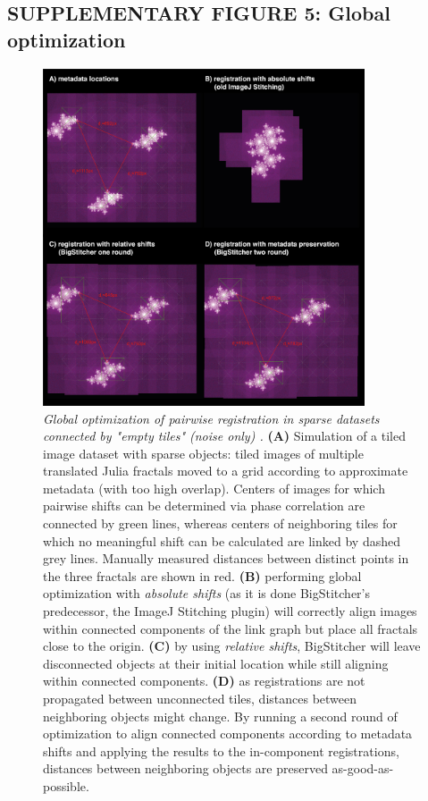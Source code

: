\documentclass[]{spie}  %
\begin{document}
\subsection*{SUPPLEMENTARY FIGURE 5: Global optimization}
\vspace{1mm}
\begin{figure}[h!]
\centerline{\includegraphics[width=0.85\textwidth]{fig-globalopt.jpg}}
\vspace{2.0mm}
\caption{\hspace{-0.5mm} \emph{Global optimization of pairwise registration in sparse datasets connected by "empty tiles" (noise only) .} \textbf{(A)} Simulation of a tiled image dataset with sparse objects: tiled images of multiple translated Julia fractals moved to a grid according to approximate metadata (with too high overlap). Centers of images for which pairwise shifts can be determined via phase correlation are connected by green lines, whereas centers of neighboring tiles for which no meaningful shift can be calculated are linked by dashed grey lines. Manually measured distances between distinct points in the three fractals are shown in red. \textbf{(B)} performing global optimization with \emph{absolute shifts} (as it is done BigStitcher's predecessor, the ImageJ Stitching plugin) will correctly align images within connected components of the link graph but place all fractals close to the origin. \textbf{(C)} by using \emph{relative shifts}, BigStitcher will leave disconnected objects at their initial location while still aligning within connected components. \textbf{(D)} as registrations are not propagated between unconnected tiles, distances between neighboring objects might change. By running a second round of optimization to align connected components according to metadata shifts and applying the results to the in-component registrations, distances between neighboring objects are preserved as-good-as-possible.
}
\label{fig:sup-fig-globalopt}
\end{figure}
\end{document}
